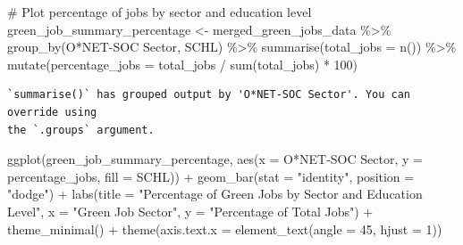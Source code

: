 \documentclass[
  letterpaper,
  DIV=11,
  numbers=noendperiod]{scrartcl}
\newenvironment{Shaded}{\begin{snugshade}}{\end{snugshade}}
\newcommand{\AttributeTok}[1]{\textcolor[rgb]{0.40,0.45,0.13}{#1}}
\newcommand{\CommentTok}[1]{\textcolor[rgb]{0.37,0.37,0.37}{#1}}
\newcommand{\DecValTok}[1]{\textcolor[rgb]{0.68,0.00,0.00}{#1}}
\newcommand{\FunctionTok}[1]{\textcolor[rgb]{0.28,0.35,0.67}{#1}}
\newcommand{\NormalTok}[1]{\textcolor[rgb]{0.00,0.23,0.31}{#1}}
\newcommand{\OtherTok}[1]{\textcolor[rgb]{0.00,0.23,0.31}{#1}}
\newcommand{\SpecialCharTok}[1]{\textcolor[rgb]{0.37,0.37,0.37}{#1}}
\newcommand{\StringTok}[1]{\textcolor[rgb]{0.13,0.47,0.30}{#1}}
\begin{document}
\begin{Shaded}
\begin{Highlighting}[]
\CommentTok{\# Plot percentage of jobs by sector and education level}
\NormalTok{green\_job\_summary\_percentage }\OtherTok{\textless{}{-}}\NormalTok{ merged\_green\_jobs\_data }\SpecialCharTok{\%\textgreater{}\%}
  \FunctionTok{group\_by}\NormalTok{(}\StringTok{\textasciigrave{}}\AttributeTok{O*NET{-}SOC Sector}\StringTok{\textasciigrave{}}\NormalTok{, SCHL) }\SpecialCharTok{\%\textgreater{}\%}
  \FunctionTok{summarise}\NormalTok{(}\AttributeTok{total\_jobs =} \FunctionTok{n}\NormalTok{()) }\SpecialCharTok{\%\textgreater{}\%}
  \FunctionTok{mutate}\NormalTok{(}\AttributeTok{percentage\_jobs =}\NormalTok{ total\_jobs }\SpecialCharTok{/} \FunctionTok{sum}\NormalTok{(total\_jobs) }\SpecialCharTok{*} \DecValTok{100}\NormalTok{)}
\end{Highlighting}
\end{Shaded}

\begin{verbatim}
`summarise()` has grouped output by 'O*NET-SOC Sector'. You can override using
the `.groups` argument.
\end{verbatim}

\begin{Shaded}
\begin{Highlighting}[]
\FunctionTok{ggplot}\NormalTok{(green\_job\_summary\_percentage, }\FunctionTok{aes}\NormalTok{(}\AttributeTok{x =} \StringTok{\textasciigrave{}}\AttributeTok{O*NET{-}SOC Sector}\StringTok{\textasciigrave{}}\NormalTok{, }\AttributeTok{y =}\NormalTok{ percentage\_jobs, }\AttributeTok{fill =}\NormalTok{ SCHL)) }\SpecialCharTok{+}
  \FunctionTok{geom\_bar}\NormalTok{(}\AttributeTok{stat =} \StringTok{"identity"}\NormalTok{, }\AttributeTok{position =} \StringTok{"dodge"}\NormalTok{) }\SpecialCharTok{+}
  \FunctionTok{labs}\NormalTok{(}\AttributeTok{title =} \StringTok{"Percentage of Green Jobs by Sector and Education Level"}\NormalTok{,}
       \AttributeTok{x =} \StringTok{"Green Job Sector"}\NormalTok{, }\AttributeTok{y =} \StringTok{"Percentage of Total Jobs"}\NormalTok{) }\SpecialCharTok{+}
  \FunctionTok{theme\_minimal}\NormalTok{() }\SpecialCharTok{+}
  \FunctionTok{theme}\NormalTok{(}\AttributeTok{axis.text.x =} \FunctionTok{element\_text}\NormalTok{(}\AttributeTok{angle =} \DecValTok{45}\NormalTok{, }\AttributeTok{hjust =} \DecValTok{1}\NormalTok{))}
\end{Highlighting}
\end{Shaded}
\end{document}
